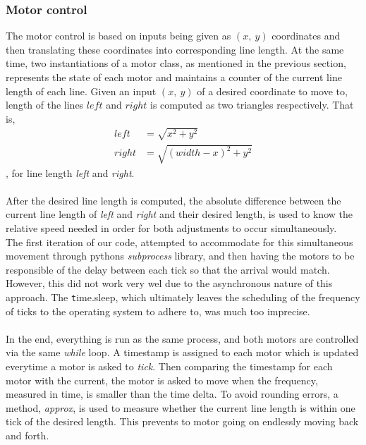 \subsubsection{Motor control}
The motor control is based on inputs being given as $(x,\ y)$ coordinates and then translating these coordinates into corresponding line length. At the same time, two instantiations of a motor class, as mentioned in the previous section, represents the state of each motor and maintains a counter of the current line length of each line. Given an input $(x,\ y)$ of a desired coordinate to move to, length of the lines $left$ and $right$ is computed as two triangles respectively. That is,
\begin{align}
left  &= \sqrt{x^2 + y^2} \\
right &= \sqrt{(width-x)^2 + y^2} 
\end{align},
for line length {\it left} and {\it right}.
\\\\
After the desired line length is computed, the absolute difference between the current line length of {\it left} and {\it right} and their desired length, is used to know the relative speed needed in order for both adjustments to occur simultaneously.\\
The first iteration of our code, attempted to accommodate for this simultaneous movement through pythons {\it subprocess} library, and then having the motors to be responsible of the delay between each {tick} so that the arrival would match. However, this did not work very wel due to the asynchronous nature of this approach. The {\texttt time.sleep}, which ultimately leaves the scheduling of the frequency of ticks to the operating system to adhere to, was much too imprecise.
\\\\
In the end, everything is run as the same process, and both motors are controlled via the same {\it while} loop. A timestamp is assigned to each motor which is updated everytime a motor is asked to {\it tick}. Then comparing the timestamp for each motor with the current, the motor is asked to move when the frequency, measured in time, is smaller than the time delta. To avoid rounding errors, a method, {\it approx}, is used to measure whether the current line length is within one tick of the desired length. This prevents to motor going on endlessly moving back and forth.

